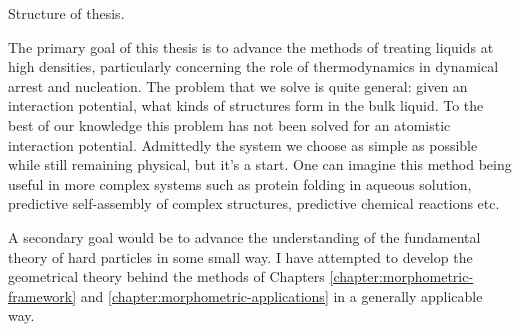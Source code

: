 \documentclass[11pt,twoside]{report}
\def\includebibliography{}
\begin{document}
Structure of thesis.

The primary goal of this thesis is to advance the methods of treating liquids at high densities, particularly concerning the role of thermodynamics in dynamical arrest and nucleation.
The problem that we solve is quite general: given an interaction potential, what kinds of structures form in the bulk liquid.
To the best of our knowledge this problem has not been solved for an atomistic interaction potential.
Admittedly the system we choose as simple as possible while still remaining physical, but it's a start.
One can imagine this method being useful in more complex systems such as protein folding in aqueous solution, predictive self-assembly of complex structures, predictive chemical reactions etc.

A secondary goal would be to advance the understanding of the fundamental theory of hard particles in some small way.
I have attempted to develop the geometrical theory behind the methods of Chapters \ref{chapter:morphometric-framework} and \ref{chapter:morphometric-applications} in a generally applicable way.

\ifdefined\includebibliography
  \printbibliography
\fi
  
\end{document}
